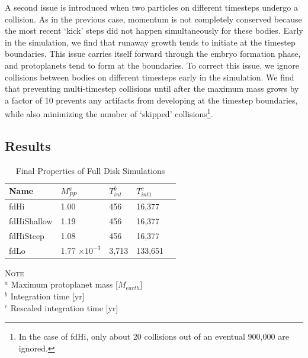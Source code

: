 \documentclass[twocolumn]{aastex63}
\begin{document}
A second issue is introduced when two particles on different timesteps undergo a collision. As in the previous case, momentum is not completely conserved because the most recent `kick' steps did not happen simultaneously for these bodies. Early in the simulation, we find that runaway growth tends to initiate at the timestep boundaries. This issue carries itself forward through the embryo formation phase, and protoplanets tend to form at the boundaries. To correct this issue, we ignore collisions between bodies on different timesteps early in the simulation. We find that preventing multi-timestep collisions until after the maximum mass grows by a factor of 10 prevents any artifacts from developing at the timestep boundaries, while also minimizing the number of `skipped' collisions\footnote{In the case of fdHi, only about 20 collisions out of an eventual 900,000 are ignored.}. 

\subsection{Results}

\begin{table}
\caption{Final Properties of Full Disk Simulations}
\begin{tabular}{lllll} \hline \hline
Name     & $M_{PP}^a$ & $T_{int}^b$ & $T_{int 1}^c$ &  \\ \hline
fdHi                 &  1.00                                                         & 456                              & 16,377  &  \\
fdHiShallow    &  1.19                                                        & 456                              & 16,377  &  \\
fdHiSteep       &  1.08                                                         & 456                              & 16,377 &  \\
fdLo                &  1.77 $\times 10^{-3}$                                  & 3,713                              & 133,651 &  \\ \hline
\end{tabular}
\label{tab:sim_properties}
\begin{flushleft}
\textsc{Note} \\ {$^a$ Maximum protoplanet mass [$M_{earth}$] \\
		       $^b$ Integration time [yr] \\
		       $^c$ Rescaled integration time [yr]} \\
\end{flushleft}
\end{table}
\end{document}
